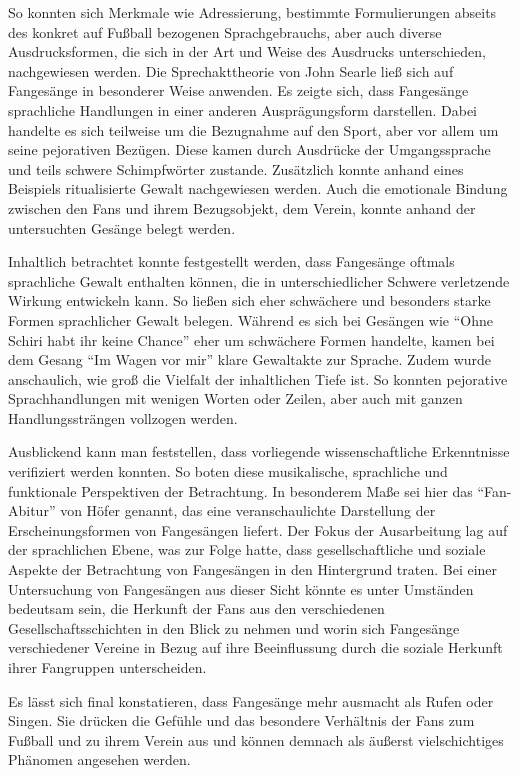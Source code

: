 So konnten sich Merkmale wie Adressierung, bestimmte Formulierungen abseits des konkret auf Fußball bezogenen Sprachgebrauchs, aber auch diverse Ausdrucksformen, die sich in der Art und Weise des Ausdrucks unterschieden, nachgewiesen werden.
Die Sprechakttheorie von John Searle ließ sich auf Fangesänge in besonderer Weise anwenden.
Es zeigte sich, dass Fangesänge sprachliche Handlungen in einer anderen Ausprägungsform darstellen.
Dabei handelte es sich teilweise um die Bezugnahme auf den Sport, aber vor allem um seine pejorativen Bezügen.
Diese kamen durch Ausdrücke der Umgangssprache und teils schwere Schimpfwörter zustande.
Zusätzlich konnte anhand eines Beispiels ritualisierte Gewalt nachgewiesen werden.
Auch die emotionale Bindung zwischen den Fans und ihrem Bezugsobjekt, dem Verein, konnte anhand der untersuchten Gesänge belegt werden.

Inhaltlich betrachtet konnte festgestellt werden, dass Fangesänge oftmals sprachliche Gewalt enthalten können, die in unterschiedlicher Schwere verletzende Wirkung entwickeln kann.
So ließen sich eher schwächere und besonders starke Formen sprachlicher Gewalt belegen.
Während es sich bei Gesängen wie "`Ohne Schiri habt ihr keine Chance"' eher um schwächere Formen handelte, kamen bei dem Gesang "`Im Wagen vor mir"' klare Gewaltakte zur Sprache.
Zudem wurde anschaulich, wie groß die Vielfalt der inhaltlichen Tiefe ist.
So konnten pejorative Sprachhandlungen mit wenigen Worten oder Zeilen, aber auch mit ganzen Handlungssträngen vollzogen werden.

Ausblickend kann man feststellen, dass vorliegende wissenschaftliche Erkenntnisse verifiziert werden konnten.
So boten diese musikalische, sprachliche und funktionale Perspektiven der Betrachtung.
In besonderem Maße sei hier das "`Fan-Abitur"' von Höfer genannt, das eine veranschaulichte Darstellung der Erscheinungsformen von Fangesängen liefert.
Der Fokus der Ausarbeitung lag auf der sprachlichen Ebene, was zur Folge hatte, dass gesellschaftliche und soziale Aspekte der Betrachtung von Fangesängen in den Hintergrund traten.
Bei einer Untersuchung von Fangesängen aus dieser Sicht könnte es unter Umständen bedeutsam sein, die Herkunft der Fans aus den verschiedenen Gesellschaftsschichten in den Blick zu nehmen und worin sich Fangesänge verschiedener Vereine in Bezug auf ihre Beeinflussung durch die soziale Herkunft ihrer Fangruppen unterscheiden.

Es lässt sich final konstatieren, dass Fangesänge mehr ausmacht als Rufen oder Singen.
Sie drücken die Gefühle und das besondere Verhältnis der Fans zum Fußball und zu ihrem Verein aus und können demnach als äußerst vielschichtiges Phänomen angesehen werden.
